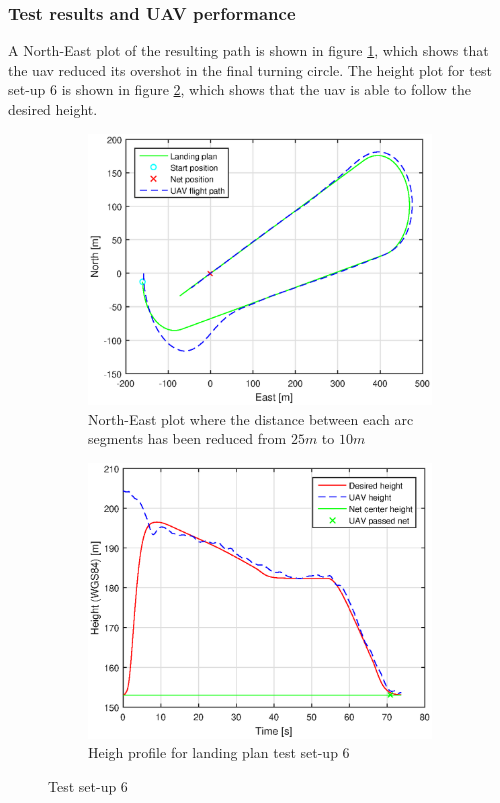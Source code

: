 \subsubsection{Test results and UAV performance}
A North-East plot of the resulting path is shown in figure \ref{Fig:NorthEast1juni083423}, which shows that the \gls{uav} reduced its overshot in the final turning circle. The height plot for test set-up 6 is shown in figure \ref{Fig:Height1juni083423}, which shows that the \gls{uav} is able to follow the desired height.
\newpage
\begin{figure}[H]
\centering
\begin{subfigure}{0.7\textwidth}
		\includegraphics[width=\textwidth]{figs/Experiment/NorthEast1juni083423.eps}
\caption{North-East plot where the distance between each arc segments has been reduced from $25 m$ to $10 m$}
\label{Fig:NorthEast1juni083423}
\end{subfigure}
\begin{subfigure}{0.7\textwidth}
		\includegraphics[width=\textwidth]{figs/Experiment/Height1juni083423.eps}
\caption{Heigh profile for landing plan test set-up 6}
\label{Fig:Height1juni083423}
\end{subfigure}
\caption{Test set-up 6}
\label{Fig:Test6}
\end{figure}


